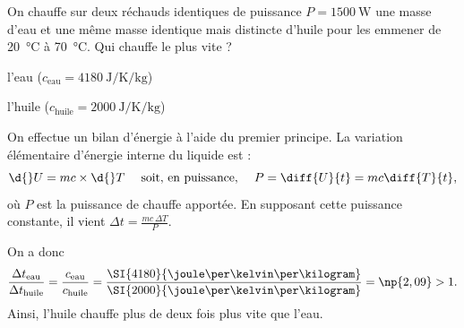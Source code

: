 
\begin{enonce}
On chauffe sur deux réchauds identiques de puissance $P=\SI{1500}{\watt}$ une masse d'eau et une même masse identique mais distincte d'huile pour les emmener de \SI{20}{\celsius} à \SI{70}{\celsius}. Qui chauffe le plus vite ?
	
	\begin{listeQCM2Colonnes}
	\item l'eau ($c_\text{eau}=\SI{4180}{\joule\per\kelvin\per\kilogram}$)
	\item  l'huile ($c_\text{huile}=\SI{2000}{\joule\per\kelvin\per\kilogram}$)
	\end{listeQCM2Colonnes}

\end{enonce}

\reponse{\reponseB{}}

\begin{corrige}
On effectue un bilan d'énergie à l'aide du premier principe. La variation élémentaire d'énergie interne du liquide est : 
\[
\d{}U=m c\times\d{}T
\quad\text{ soit, en puissance, }\quad
P=\diff{U}{t}=m c\diff{T}{t},
\]
où $P$ est la puissance de chauffe apportée. En supposant cette puissance constante, il vient $\Delta t=\frac{m c \, \Delta T}{P}$.

On a donc
\[
\frac{\Delta t_{\text{eau}}}{\Delta t_{\text{huile}}} = \frac{c_\text{eau}}{c_\text{huile}} = \frac{\SI{4180}{\joule\per\kelvin\per\kilogram}}{\SI{2000}{\joule\per\kelvin\per\kilogram}} = \np{2,09} > 1.
\]
Ainsi, l'huile chauffe plus de deux fois plus vite que l'eau.
\end{corrige}


\finEntrainement













\hauteurLargeurCadreReponse		{9mm}{5cm}
\initialisationEntrainement



